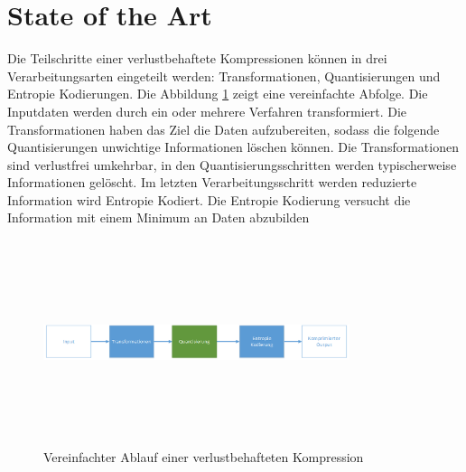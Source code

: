\section{State of the Art}
Die Teilschritte einer verlustbehaftete Kompressionen können in drei Verarbeitungsarten eingeteilt werden: Transformationen, Quantisierungen und Entropie Kodierungen. Die Abbildung \ref{state:aufbau} zeigt eine vereinfachte Abfolge. Die Inputdaten werden durch ein oder mehrere Verfahren transformiert. Die Transformationen haben das Ziel die Daten aufzubereiten, sodass die folgende Quantisierungen unwichtige Informationen löschen können. Die Transformationen sind  verlustfrei umkehrbar, in den Quantisierungsschritten werden typischerweise Informationen gelöscht. Im letzten Verarbeitungsschritt werden reduzierte Information wird Entropie Kodiert. Die Entropie Kodierung versucht die Information mit einem Minimum an Daten abzubilden\\
\begin{figure}[!htbp]
	\center
	\includegraphics[width=0.8\textwidth,height=6cm,keepaspectratio]{./pictures/state/aufbau.png}
	\caption{Vereinfachter Ablauf einer verlustbehafteten Kompression}
	\label{state:aufbau}
\end{figure}


